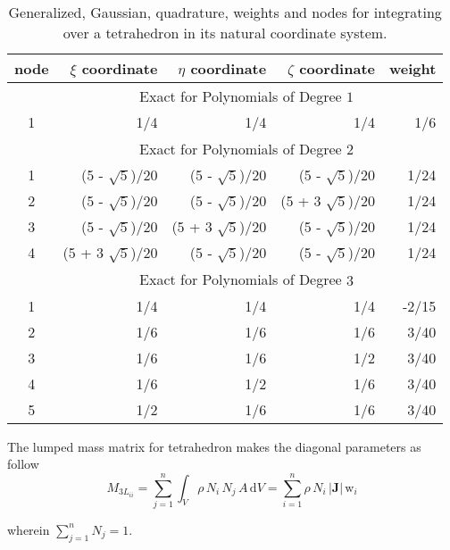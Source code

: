 \begin{table}
    \centering
    \begin{tabular}{|c|rrrr|}
        \hline
        node & \centering $\xi$ coordinate \phantom{1234}  & 
        $\eta$ coordinate \phantom{1234} & 
        $\zeta$ coordinate \phantom{1234} & weight \phantom{12345} \\ \hline        
        & \multicolumn{4}{|c|}{Exact for Polynomials of Degree $1^{\phantom{|^|}}$} \\ 
        \hline
        1 & 1/4 & 1/4 & 1/4 & 1/6 \\ 
        \hline
        & \multicolumn{4}{|c|}{Exact for Polynomials of Degree $2^{\phantom{|^|}}$} \\ \hline
        1 & (5 - $\sqrt{5}$)/20 & (5 - $\sqrt{5}$)/20 & (5 - $\sqrt{5}$)/20 & 1/24\\
        2 & (5 - $\sqrt{5}$)/20 & (5 - $\sqrt{5}$)/20 & (5 + 3 $\sqrt{5}$)/20 & 1/24\\
        3 & (5 - $\sqrt{5}$)/20 & (5 + 3 $\sqrt{5}$)/20 & (5 - $\sqrt{5}$)/20 & 1/24\\ 
        4 & (5 + 3 $\sqrt{5}$)/20 & (5 - $\sqrt{5}$)/20 & (5 - $\sqrt{5}$)/20 & 1/24\\ 
        \hline
        & \multicolumn{4}{|c|}{Exact for Polynomials of Degree $3^{\phantom{|^|}}$} \\ \hline
        1 & 1/4 & 1/4 & 1/4 & -2/15 \\
        2 & 1/6 & 1/6 & 1/6 & 3/40\\
        3 & 1/6 & 1/6 & 1/2 & 3/40\\ 
        4 & 1/6 & 1/2 & 1/6 & 3/40 \\
        5 & 1/2 & 1/6 & 1/6 & 3/40 \\
        \hline
    \end{tabular}
    \caption{Generalized, Gaussian, quadrature, weights and nodes  for integrating over a tetrahedron in its natural coordinate system.}
    \label{tabQuadraturetetra}
\end{table}


The lumped mass matrix for tetrahedron makes the diagonal parameters as follow
\begin{equation}
{M}_{3L_{ii}} = \sum_{j=1}^n \int_{V}  \rho \, N_i \, N_j \, A \, \mathrm{d} V = \sum_{i=1}^n  \rho  \, N_i\, |\mathbf{J}| \, \mathrm{w}_i
\label{LumMass3D}
\end{equation}

wherein $\sum_{j=1}^n N_j = 1$. 


